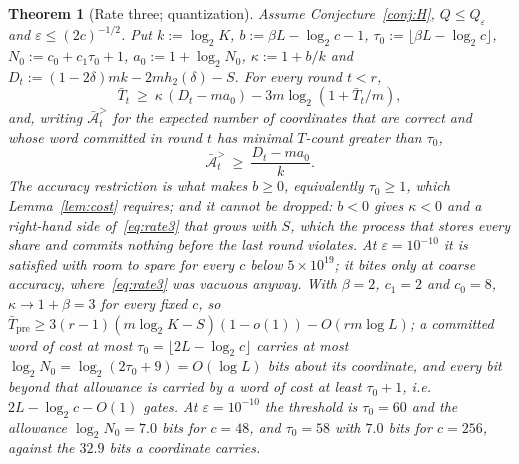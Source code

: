 \documentclass[aps,prx,twocolumn,superscriptaddress,nofootinbib,longbibliography]{revtex4-2}
\theoremstyle{plain}
\newtheorem{theorem}{Theorem}
\theoremstyle{definition}
\theoremstyle{remark}
\newcommand{\Tpre}{T_{\mathrm{pre}}}
\begin{document}
\begin{theorem}[Rate three; quantization]\label{thm:main2}
Assume Conjecture~\ref{conj:H}, $Q\le Q_\varepsilon$ and $\varepsilon\le(2c)^{-1/2}$. Put $k:=\log_2K$, $b:=\beta L-\log_2c-1$, $\tau_0:=\lfloor\beta L-\log_2c\rfloor$, $N_0:=c_0+c_1\tau_0+1$, $a_0:=1+\log_2N_0$, $\kappa:=1+b/k$ and $D_t:=(1-2\delta)mk-2mh_2(\delta)-S$. For every round $t<r$,
\begin{equation}\label{eq:rate3}
\bar T_t\ \ge\ \kappa\,(D_t-ma_0)-3m\log_2(1+\bar T_t/m),
\end{equation}
and, writing $\bar{\mathcal A}^{>}_t$ for the expected number of coordinates that are correct and whose word committed in round $t$ has minimal $T$-count greater than $\tau_0$,
\begin{equation}\label{eq:active}
\bar{\mathcal A}^{>}_t\ \ge\ \frac{D_t-ma_0}{k}.
\end{equation}
The accuracy restriction is what makes $b\ge0$, equivalently $\tau_0\ge1$, which Lemma~\ref{lem:cost} requires; and it cannot be dropped: $b<0$ gives $\kappa<0$ and a right-hand side of~\eqref{eq:rate3} that grows with $S$, which the process that stores every share and commits nothing before the last round violates. At $\varepsilon=10^{-10}$ it is satisfied with room to spare for every $c$ below $5\times10^{19}$; it bites only at coarse accuracy, where~\eqref{eq:rate3} was vacuous anyway. With $\beta=2$, $c_1=2$ and $c_0=8$, $\kappa\to1+\beta=3$ for every fixed $c$, so $\bar\Tpre\ge3(r-1)(m\log_2K-S)(1-o(1))-O(rm\log L)$; a committed word of cost at most $\tau_0=\lfloor2L-\log_2c\rfloor$ carries at most $\log_2N_0=\log_2(2\tau_0+9)=O(\log L)$ bits about its coordinate, and every bit beyond that allowance is carried by a word of cost at least $\tau_0+1$, i.e.\ $2L-\log_2c-O(1)$ gates. At $\varepsilon=10^{-10}$ the threshold is $\tau_0=60$ and the allowance $\log_2N_0=7.0$ bits for $c=48$, and $\tau_0=58$ with $7.0$ bits for $c=256$, against the $32.9$ bits a coordinate carries.
\end{theorem}
\end{document}

